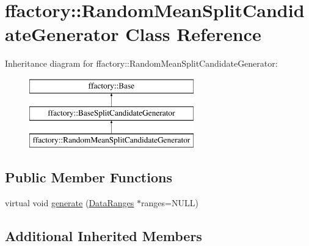 \hypertarget{classffactory_1_1_random_mean_split_candidate_generator}{\section{ffactory\-:\-:Random\-Mean\-Split\-Candidate\-Generator Class Reference}
\label{classffactory_1_1_random_mean_split_candidate_generator}
}
Inheritance diagram for ffactory\-:\-:Random\-Mean\-Split\-Candidate\-Generator\-:\begin{figure}[H]
\begin{center}
\leavevmode
\includegraphics[height=3.000000cm]{classffactory_1_1_random_mean_split_candidate_generator}
\end{center}
\end{figure}
\subsection*{Public Member Functions}
\begin{DoxyCompactItemize}
\item 
virtual void \hyperlink{classffactory_1_1_random_mean_split_candidate_generator_a76cc81286da9f7598b146b212efd9c66}{generate} (\hyperlink{classffactory_1_1_data_ranges}{Data\-Ranges} $\ast$ranges=N\-U\-L\-L)
\end{DoxyCompactItemize}
\subsection*{Additional Inherited Members}


